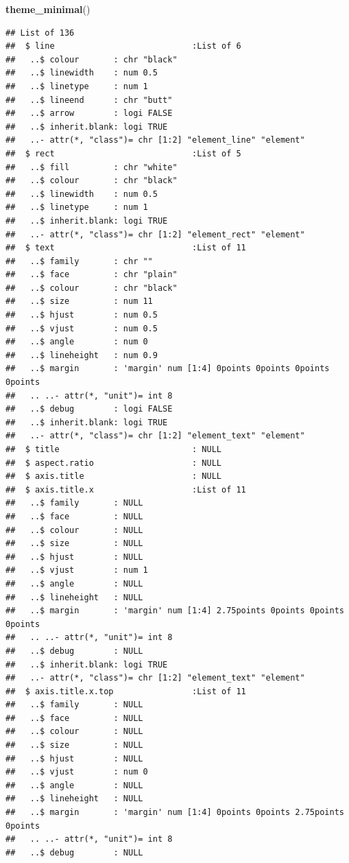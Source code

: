 \documentclass[
  12pt,
]{article}
\newenvironment{Shaded}{\begin{snugshade}}{\end{snugshade}}
\newcommand{\FunctionTok}[1]{\textcolor[rgb]{0.13,0.29,0.53}{\textbf{#1}}}
\newcommand{\NormalTok}[1]{#1}
\begin{document}
\begin{Shaded}
\begin{Highlighting}[]
  \FunctionTok{theme\_minimal}\NormalTok{()}
\end{Highlighting}
\end{Shaded}

\begin{verbatim}
## List of 136
##  $ line                            :List of 6
##   ..$ colour       : chr "black"
##   ..$ linewidth    : num 0.5
##   ..$ linetype     : num 1
##   ..$ lineend      : chr "butt"
##   ..$ arrow        : logi FALSE
##   ..$ inherit.blank: logi TRUE
##   ..- attr(*, "class")= chr [1:2] "element_line" "element"
##  $ rect                            :List of 5
##   ..$ fill         : chr "white"
##   ..$ colour       : chr "black"
##   ..$ linewidth    : num 0.5
##   ..$ linetype     : num 1
##   ..$ inherit.blank: logi TRUE
##   ..- attr(*, "class")= chr [1:2] "element_rect" "element"
##  $ text                            :List of 11
##   ..$ family       : chr ""
##   ..$ face         : chr "plain"
##   ..$ colour       : chr "black"
##   ..$ size         : num 11
##   ..$ hjust        : num 0.5
##   ..$ vjust        : num 0.5
##   ..$ angle        : num 0
##   ..$ lineheight   : num 0.9
##   ..$ margin       : 'margin' num [1:4] 0points 0points 0points 0points
##   .. ..- attr(*, "unit")= int 8
##   ..$ debug        : logi FALSE
##   ..$ inherit.blank: logi TRUE
##   ..- attr(*, "class")= chr [1:2] "element_text" "element"
##  $ title                           : NULL
##  $ aspect.ratio                    : NULL
##  $ axis.title                      : NULL
##  $ axis.title.x                    :List of 11
##   ..$ family       : NULL
##   ..$ face         : NULL
##   ..$ colour       : NULL
##   ..$ size         : NULL
##   ..$ hjust        : NULL
##   ..$ vjust        : num 1
##   ..$ angle        : NULL
##   ..$ lineheight   : NULL
##   ..$ margin       : 'margin' num [1:4] 2.75points 0points 0points 0points
##   .. ..- attr(*, "unit")= int 8
##   ..$ debug        : NULL
##   ..$ inherit.blank: logi TRUE
##   ..- attr(*, "class")= chr [1:2] "element_text" "element"
##  $ axis.title.x.top                :List of 11
##   ..$ family       : NULL
##   ..$ face         : NULL
##   ..$ colour       : NULL
##   ..$ size         : NULL
##   ..$ hjust        : NULL
##   ..$ vjust        : num 0
##   ..$ angle        : NULL
##   ..$ lineheight   : NULL
##   ..$ margin       : 'margin' num [1:4] 0points 0points 2.75points 0points
##   .. ..- attr(*, "unit")= int 8
##   ..$ debug        : NULL

\end{verbatim}
\end{document}
